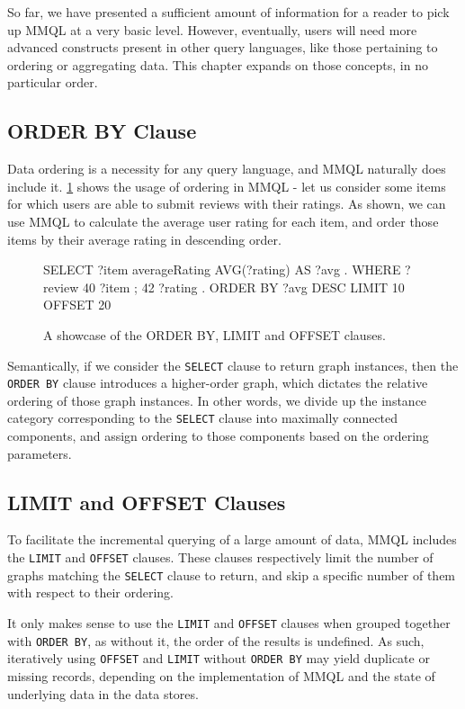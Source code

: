 So far, we have presented a sufficient amount of information for a reader to pick up MMQL at a very basic level.
However, eventually, users will need more advanced constructs present in other query languages, like those pertaining to ordering or aggregating data.
This chapter expands on those concepts, in no particular order.

\subsection{ORDER BY Clause}

Data ordering is a necessity for any query language, and MMQL naturally does include it.
\cref{mmql:figure:orderby} shows the usage of ordering in MMQL - let us consider some items for which users are able to submit reviews with their ratings.
As shown, we can use MMQL to calculate the average user rating for each item, and order those items by their average rating in descending order.

\begin{figure}[ht]
\begin{code}
SELECT {
    ?item averageRating AVG(?rating) AS ?avg .
}
WHERE {
    ?review 40 ?item ;
        42 ?rating .
}
ORDER BY ?avg DESC
LIMIT 10
OFFSET 20
\end{code}
\caption{A showcase of the ORDER BY, LIMIT and OFFSET clauses.}\label{mmql:figure:orderby}
\end{figure}

Semantically, if we consider the \texttt{SELECT} clause to return graph instances, then the \texttt{ORDER BY} clause introduces a higher-order graph, which dictates the relative ordering of those graph instances.
In other words, we divide up the instance category corresponding to the \texttt{SELECT} clause into maximally connected components, and assign ordering to those components based on the ordering parameters.

\subsection{LIMIT and OFFSET Clauses}

To facilitate the incremental querying of a large amount of data, MMQL includes the \texttt{LIMIT} and \texttt{OFFSET} clauses.
These clauses respectively limit the number of graphs matching the \texttt{SELECT} clause to return, and skip a specific number of them with respect to their ordering.

It only makes sense to use the \texttt{LIMIT} and \texttt{OFFSET} clauses when grouped together with \texttt{ORDER BY}, as without it, the order of the results is undefined.
As such, iteratively using \texttt{OFFSET} and \texttt{LIMIT} without \texttt{ORDER BY} may yield duplicate or missing records, depending on the implementation of MMQL and the state of underlying data in the data stores.

